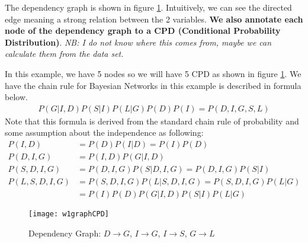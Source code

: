 The dependency graph is shown in figure \ref{w1graphCPD}. Intuitively, we can see the directed edge meaning a strong relation between the 2 variables. \textbf{We also annotate each node of the dependency graph to a CPD (Conditional Probability Distribution)}. \textit{NB: I do not know where this comes from, maybe we can calculate them from the data set.} 

In this example, we have 5 nodes so we will have 5 CPD as shown in figure \ref{w1graphCPD}. We have the chain rule for Bayesian Networks in this example is described in formula below.
\begin{align}
P(G|I,D)P(S|I)P(L|G)P(D)P(I) = P(D,I,G,S,L)
\end{align}
Note that this formula is derived from the standard chain rule of probability and some assumption about the independence as following:
\begin{align*}
P(I,D) 		 	&= P(D) P(I|D) = P(I) P(D)\\  
P(D,I,G) 	 	&= P(I,D) P(G|I,D) \\
P(S,D,I,G)   	&= P(D,I,G) P(S|D,I,G) = P(D,I,G) P(S|I) \\
P(L,S,D,I,G) 	&= P(S,D,I,G) P(L|S,D,I,G) = P(S,D,I,G) P(L|G) \\
				&= P(I) P(D) P(G|I,D) P(S|I) P(L|G)
\end{align*}


\begin{figure}[!ht]
\centering
\texttt{[image: w1graphCPD]}
\caption[Dependency Graph]{Dependency Graph: $D \rightarrow G$, $I \rightarrow G$, $I \rightarrow S$, $G \rightarrow L$}
\label{w1graphCPD}
\end{figure}



